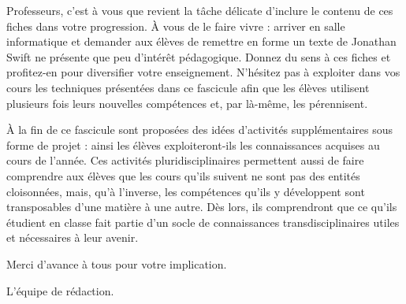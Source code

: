 \vspace{18pt}

Professeurs, c'est à vous que revient la tâche délicate d'inclure le contenu de ces fiches dans votre progression. À vous de le faire vivre : arriver en salle informatique et demander aux élèves de remettre en forme un texte de Jonathan Swift ne présente que peu d'intérêt pédagogique. Donnez du sens à ces fiches et profitez-en pour diversifier votre enseignement. N'hésitez pas à exploiter dans vos cours les techniques présentées dans ce fascicule afin que les élèves utilisent plusieurs fois leurs nouvelles compétences et, par là-même, les pérennisent.

\vspace{18pt}

À la fin de ce fascicule sont proposées des idées d'activités supplémentaires sous forme de projet : ainsi les élèves exploiteront-ils les connaissances acquises au cours de l'année. Ces activités pluridisciplinaires permettent aussi de faire comprendre aux élèves que les cours qu'ils suivent ne sont pas des entités cloisonnées, mais, qu'à l'inverse, les compétences qu'ils y développent sont transposables d'une matière à une autre. Dès lors, ils comprendront que ce qu'ils étudient en classe fait partie d’un socle de connaissances transdisciplinaires utiles et nécessaires à leur avenir.

\vspace{18pt}



Merci d'avance à tous pour votre implication.

\vspace{18pt}

L'équipe de rédaction.

\vspace{2cm}


  
